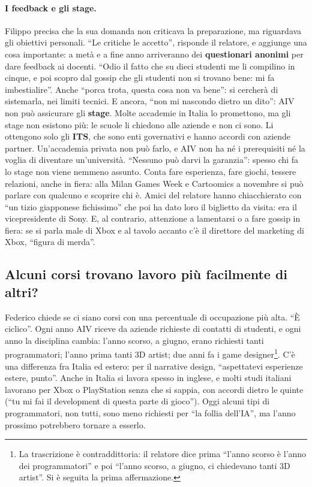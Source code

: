 \paragraph{I feedback e gli stage.} Filippo precisa che la sua domanda non
criticava la preparazione, ma riguardava gli obiettivi personali. ``Le critiche
le accetto'', risponde il relatore, e aggiunge una cosa importante: a metà e a
fine anno arriveranno dei \textbf{questionari anonimi} per dare feedback ai
docenti. ``Odio il fatto che su dieci studenti me li compilino in cinque, e poi
scopro dal gossip che gli studenti non si trovano bene: mi fa imbestialire''.
Anche ``porca trota, questa cosa non va bene'': si cercherà di sistemarla, nei
limiti tecnici. E ancora, ``non mi nascondo dietro un dito'': AIV non può
assicurare gli \textbf{stage}. Molte accademie in Italia lo promettono, ma gli
stage non esistono più: le scuole li chiedono alle aziende e non ci sono. Li
ottengono solo gli \textbf{ITS}, che sono enti governativi e hanno accordi con
aziende partner. Un'accademia privata non può farlo, e AIV non ha né i
prerequisiti né la voglia di diventare un'università. ``Nessuno può darvi la
garanzia'': spesso chi fa lo stage non viene nemmeno assunto. Conta fare
esperienza, fare giochi, tessere relazioni, anche in fiera: alla Milan Games
Week e Cartoomics a novembre si può parlare con qualcuno e scoprire chi è. Amici
del relatore hanno chiacchierato con ``un tizio giapponese fichissimo'' che poi
ha dato loro il biglietto da visita: era il vicepresidente di Sony. E, al
contrario, attenzione a lamentarsi o a fare gossip in fiera: se si parla male di
Xbox e al tavolo accanto c'è il direttore del marketing di Xbox, ``figura di
merda''.

\subsection{Alcuni corsi trovano lavoro più facilmente di altri?}

Federico chiede se ci siano corsi con una percentuale di occupazione più alta.
``È ciclico''. Ogni anno AIV riceve da aziende richieste di contatti di
studenti, e ogni anno la disciplina cambia: l'anno scorso, a giugno, erano
richiesti tanti programmatori; l'anno prima tanti 3D artist; due anni fa i
game designer\footnote{La trascrizione è contraddittoria: il relatore dice
prima ``l'anno scorso è l'anno dei programmatori'' e poi ``l'anno scorso, a
giugno, ci chiedevano tanti 3D artist''. Si è seguita la prima affermazione.}.
C'è una differenza fra Italia ed estero: per il narrative design, ``aspettatevi
esperienze estere, punto''. Anche in Italia si lavora spesso in inglese, e molti
studi italiani lavorano per Xbox o PlayStation senza che si sappia, con accordi
dietro le quinte (``tu mi fai il development di questa parte di gioco''). Oggi
alcuni tipi di programmatori, non tutti, sono meno richiesti per ``la follia
dell'IA'', ma l'anno prossimo potrebbero tornare a esserlo.

